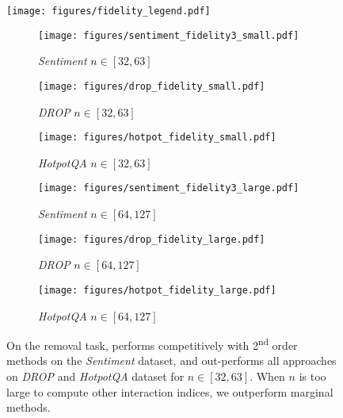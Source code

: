 \begin{figure*}[t]
\centering
\begin{center} 
  \texttt{[image: figures/fidelity\_legend.pdf]}
\end{center}
\begin{subfigure}[b]{.3\textwidth}
  \centering
  \texttt{[image: figures/sentiment\_fidelity3\_small.pdf]}
  \caption{\emph{Sentiment} $n\in [32,63]$}
  \label{fig:fidelity_sentiment}
\end{subfigure}%
\begin{subfigure}[b]{.3\textwidth}
  \centering
  \texttt{[image: figures/drop\_fidelity\_small.pdf]}
  \caption{\emph{DROP} $n\in [32,63]$}
  \label{fig:fidelity_drop}
\end{subfigure}%
\begin{subfigure}[b]{.3\textwidth}
  \centering
  \texttt{[image: figures/hotpot\_fidelity\_small.pdf]}
  \caption{\emph{HotpotQA} $n\in [32,63]$}
  \label{fig:fidelity_hotpot}
\end{subfigure}
\begin{subfigure}[b]{.3\textwidth}
  \centering
  \texttt{[image: figures/sentiment\_fidelity3\_large.pdf]}
  \caption{\emph{Sentiment} $n\in [64,127]$}
  \label{fig:fidelity_sentiment2}
\end{subfigure}%
\begin{subfigure}[b]{.3\textwidth}
  \centering
  \texttt{[image: figures/drop\_fidelity\_large.pdf]}
  \caption{\emph{DROP} $n\in [64,127]$}
  \label{fig:fidelity_drop2}
\end{subfigure}%
\begin{subfigure}[b]{.3\textwidth}
  \centering
  \texttt{[image: figures/hotpot\_fidelity\_large.pdf]}
  \caption{\emph{HotpotQA} $n\in [64,127]$}
  \label{fig:fidelity_hotpot2}
\end{subfigure}
\vspace{-5pt}
\caption{On the removal task, \SpecExp{} performs competitively with 2\textsuperscript{nd} order methods on the \emph{Sentiment} dataset, and out-performs all approaches on \emph{DROP} and  \emph{HotpotQA} dataset for $n \in [32,63]$. When $n$ is too large to compute other interaction indices, we outperform marginal methods.}
\label{fig:fidelity}
\vspace{-12pt}
\end{figure*}

\vspace{-14pt}
